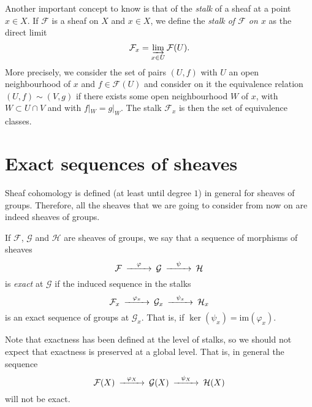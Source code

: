 \documentclass[12pt,a4paper]{article}
\begin{document}
    Another important concept to know is that of the \emph{stalk} of a sheaf at a point $x\in X$. If $\mathcal{F}$ is a sheaf on $X$ and $x\in X$, we define the \emph{stalk of $\mathcal{F}$ on $x$} as the direct limit
    \begin{equation*}
      \mathcal{F}_x=\varinjlim_{x \in U} \mathcal{F}(U).
    \end{equation*}
    More precisely, we consider the set of pairs $(U,f)$ with $U$ an open neighbourhood of $x$ and $f\in \mathcal{F}(U)$ and consider on it the equivalence relation $(U,f)\sim (V,g)$ if there exists some open neighbourhood $W$ of $x$, with $W\subset U\cap V$ and with $f|_W =g|_W$. The stalk $\mathcal{F}_x$ is then the set of equivalence classes.

    \section*{Exact sequences of sheaves}
    Sheaf cohomology is defined (at least until degree $1$) in general for sheaves of groups. Therefore, all the sheaves that we are going to consider from now on are indeed sheaves of groups. 

    If $\mathcal{F}$, $\mathcal{G}$ and $\mathcal{H}$ are sheaves of groups, we say that a sequence of morphisms of sheaves 
    \begin{equation*}
      \begin{CD}
	\mathcal{F} @> \varphi >> \mathcal{G} @> \psi >> \mathcal{H}
      \end{CD}
    \end{equation*}
    is \emph{exact} at $\mathcal{G}$ if the induced sequence in the stalks
    \begin{equation*}
      \begin{CD}
	\mathcal{F}_x @> \varphi_x >> \mathcal{G}_x @> \psi_x >> \mathcal{H}_x
      \end{CD}
    \end{equation*}
    is an exact sequence of groups at $\mathcal{G}_x$. That is, if $\ker(\psi_x) = \mathrm{im}(\varphi_x)$.

    Note that exactness has been defined at the level of stalks, so we should not expect that exactness is preserved at a global level. That is, in general the sequence 
    \begin{equation*}
      \begin{CD}
	\mathcal{F}(X) @> \varphi_X >> \mathcal{G}(X) @> \psi_X >> \mathcal{H}(X)
      \end{CD}
    \end{equation*}
    will not be exact.
\end{document}
